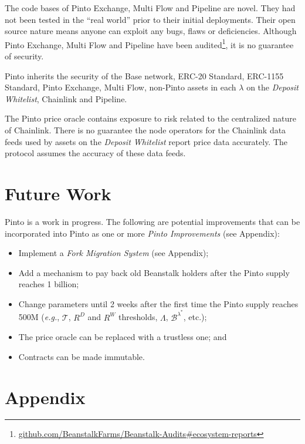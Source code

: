 \documentclass[tikz]{article}
\newcommand{\term}[1]{\textsl{#1}}
\newcommand{\fref}[1]{\footnote{\href{http://#1}{#1}}}
\begin{document}
The code bases of Pinto Exchange, Multi Flow and Pipeline are novel. They had not been tested in the “real world” prior to their initial deployments. Their open source nature means anyone can exploit any bugs, flaws or deficiencies. Although Pinto Exchange, Multi Flow and Pipeline have been audited\fref{github.com/BeanstalkFarms/Beanstalk-Audits\#ecosystem-reports}, it is no guarantee of security.

Pinto inherits the security of the Base network, ERC-20 Standard, ERC-1155 Standard, Pinto Exchange, Multi Flow, non-Pinto assets in each $\lambda$ on the \term{Deposit Whitelist}, Chainlink and Pipeline. 

The Pinto price oracle contains exposure to risk related to the centralized nature of Chainlink. There is no guarantee the node operators for the Chainlink data feeds used by assets on the \term{Deposit Whitelist} report price data accurately. The protocol assumes the accuracy of these data feeds.


\section{Future Work}

Pinto is a work in progress. The following are potential improvements that can be incorporated into Pinto as one or more \term{Pinto Improvements} (see Appendix):

\begin{itemize}
    \item Implement a \term{Fork Migration System} (see Appendix);
    \item Add a mechanism to pay back old Beanstalk holders after the Pinto supply reaches 1 billion;
    \item Change parameters until 2 weeks after the first time the Pinto supply reaches 500M (\textit{e.g.}, $\mathscr{T}$, $R^{D}$ and $R^{W}$ thresholds, $\Lambda$, $\mathscr{B}^{\lambda^{*}}$, etc.);
    \item The price oracle can be replaced with a trustless one; and
    \item Contracts can be made immutable.
\end{itemize}


\newpage
\section{Appendix}
\end{document}
